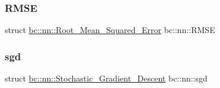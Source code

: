 \subsubsection{\texorpdfstring{R\+M\+SE}{RMSE}}
{\footnotesize\ttfamily struct \hyperlink{structbc_1_1nn_1_1Root__Mean__Squared__Error}{bc\+::nn\+::\+Root\+\_\+\+Mean\+\_\+\+Squared\+\_\+\+Error}  bc\+::nn\+::\+R\+M\+SE}

\mbox{\label{namespacebc_1_1nn_a4b614663e3ff7f18425e5dc00ebbb67c}} 
\subsubsection{\texorpdfstring{sgd}{sgd}}
{\footnotesize\ttfamily struct \hyperlink{structbc_1_1nn_1_1Stochastic__Gradient__Descent}{bc\+::nn\+::\+Stochastic\+\_\+\+Gradient\+\_\+\+Descent}  bc\+::nn\+::sgd}

